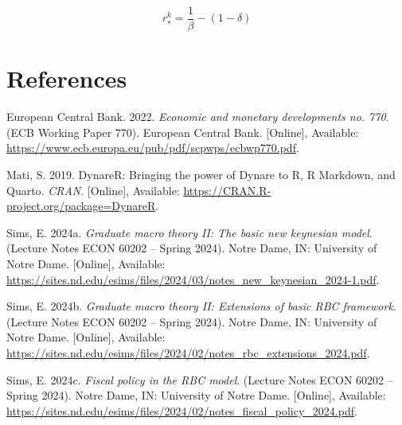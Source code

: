 \documentclass[11pt,preprint]{elsarticle}
\numberwithin{equation}{section}
\numberwithin{figure}{section}
\numberwithin{table}{section}
\newlength{\cslhangindent}
\newenvironment{CSLReferences}[2] %
{\begin{list}{}{%
	\setlength{\itemindent}{0pt}
	\setlength{\leftmargin}{0pt}
	\setlength{\parsep}{0pt}
	\ifodd #1
	\setlength{\leftmargin}{\cslhangindent}
	\setlength{\itemindent}{-1\cslhangindent}
	\fi
	\setlength{\itemsep}{#2\baselineskip}}}
{\end{list}}
\begin{document}
\begin{equation}
\label{steady_capital_return_real_app}
\boxed{
r^k_* = \frac{1}{\beta} - (1-\delta)
}
\end{equation}

\newpage

\newpage

\newpage

\section*{References}\label{references}

\label{refs}
\begin{CSLReferences}{1}{1}
European Central Bank. 2022. \emph{Economic and monetary developments
no. 770}. (ECB Working Paper 770). European Central Bank. {[}Online{]},
Available: \url{https://www.ecb.europa.eu/pub/pdf/scpwps/ecbwp770.pdf}.

Mati, S. 2019. DynareR: Bringing the power of {Dynare} to {R}, {R
Markdown}, and {Quarto}. \emph{CRAN}. {[}Online{]}, Available:
\url{https://CRAN.R-project.org/package=DynareR}.

Sims, E. 2024a. \emph{Graduate macro theory II: The basic new keynesian
model}. (Lecture Notes ECON 60202 -- Spring 2024). Notre Dame, IN:
University of Notre Dame. {[}Online{]}, Available:
\url{https://sites.nd.edu/esims/files/2024/03/notes_new_keynesian_2024-1.pdf}.

Sims, E. 2024b. \emph{Graduate macro theory II: Extensions of basic RBC
framework}. (Lecture Notes ECON 60202 -- Spring 2024). Notre Dame, IN:
University of Notre Dame. {[}Online{]}, Available:
\url{https://sites.nd.edu/esims/files/2024/02/notes_rbc_extensions_2024.pdf}.

Sims, E. 2024c. \emph{Fiscal policy in the RBC model}. (Lecture Notes
ECON 60202 -- Spring 2024). Notre Dame, IN: University of Notre Dame.
{[}Online{]}, Available:
\url{https://sites.nd.edu/esims/files/2024/02/notes_fiscal_policy_2024.pdf}.

\end{CSLReferences}


\end{document}
